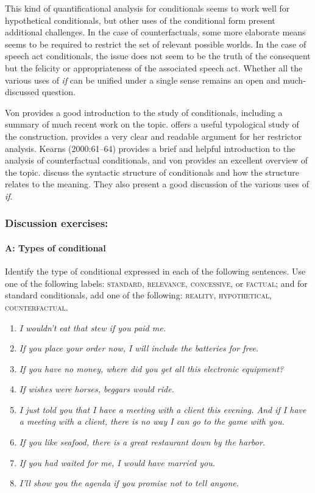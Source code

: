 This kind of quantificational analysis for conditionals seems to work well for hypothetical conditionals, but other uses of the conditional form present additional challenges. In the case of counterfactuals, some more elaborate means seems to be required to restrict the set of relevant possible worlds. In the case of speech act conditionals, the issue does not seem to be the truth of the consequent but the felicity or appropriateness of the associated speech act. Whether all the various uses of \textit{if} can be unified under a single sense remains an open and much-discussed question.



\furtherreading



Von \citet{Fintel2011} provides a good introduction to the study of conditionals, including a summary of much recent work on the topic. \citet{Comrie1986} offers a useful typological study of the construction. \citet{Kratzer1986} provides a very clear and readable argument for her restrictor analysis. Kearns (2000:61–64) provides a brief and helpful introduction to the analysis of counterfactual conditionals, and von \citet{Fintel2012} provides an excellent overview of the topic. \citet{BhattPancheva2006} discuss the syntactic structure of conditionals and how the structure relates to the meaning. They also present a good discussion of the various uses of \textit{if}.


\subsubsection{Discussion exercises:}\label{sec:}
\paragraph{A: Types of conditional}

Identify the type of conditional expressed in each of the following sentences. Use one of the following labels: \textsc{standard, relevance, concessive}, or \textsc{factual}; and for standard conditionals, add one of the following: \textsc{reality, hypothetical, counterfactual}.

\begin{enumerate}
\item \itshape
I wouldn’t eat that stew if you paid me.
\item \itshape
If you place your order now, I will include the batteries for free.
\item \itshape
If you have no money, where did you get all this electronic equipment?
\item \itshape
If wishes were horses, beggars would ride.
\item \itshape
I just told you that I have a meeting with a client this evening. And if I have a meeting with a client, there is no way I can go to the game with you.
\item \itshape
If you like seafood, there is a great restaurant down by the harbor.
\item \itshape
If you had waited for me, I would have married you.
\item \itshape
I’ll show you the agenda if you promise not to tell anyone.
\end{enumerate}
